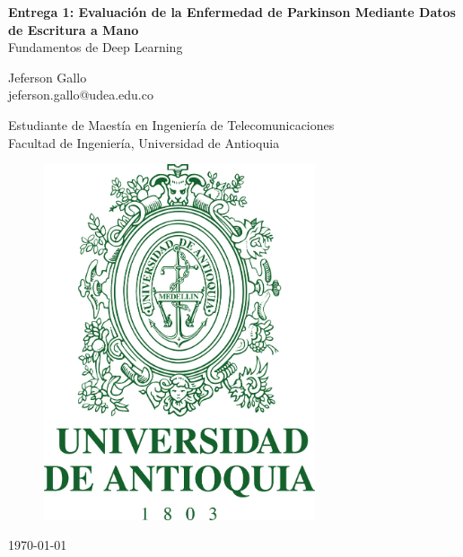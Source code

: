 \documentclass[10pt, a4paper]{article}
\begin{document}
\begin{titlepage}
    \begin{center}
            
        \huge
        \textbf{Entrega 1: Evaluación de la Enfermedad de Parkinson Mediante Datos de Escritura a Mano}\\
        
        \huge
        Fundamentos de Deep Learning
        
        \vspace{1cm}
        Jeferson Gallo\\
        \large
        jeferson.gallo@udea.edu.co

        \vspace{1cm}
        
        \Large
       Estudiante de Maestía en Ingeniería de Telecomunicaciones\\
        Facultad de Ingeniería, Universidad de Antioquia

        \vspace{1.5cm}
        
        \begin{figure}[h!]
            \centering
            \includegraphics[width=8cm]{images/logosimbolo-vertical.png}
        \end{figure}
        
        \vfill
        \Large
        \today
            
    \end{center}
\end{titlepage}
\end{document}
